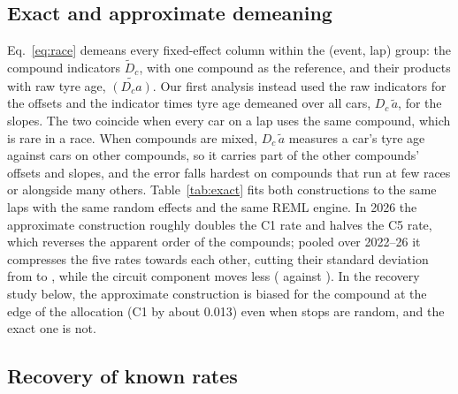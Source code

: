 \subsection{Exact and approximate demeaning}\label{app:exact}

Eq.~\eqref{eq:race} demeans every fixed-effect column within the (event, lap) group: the compound indicators $\tilde D_{c}$, with one compound as the reference, and their products with raw tyre age, $\widetilde{(D_c a)}$.
Our first analysis instead used the raw indicators for the offsets and the indicator times tyre age demeaned over all cars, $D_c\,\tilde a$, for the slopes.
The two coincide when every car on a lap uses the same compound, which is rare in a race.
When compounds are mixed, $D_c\,\tilde a$ measures a car's tyre age against cars on other compounds, so it carries part of the other compounds' offsets and slopes, and the error falls hardest on compounds that run at few races or alongside many others.
Table~\ref{tab:exact} fits both constructions to the same laps with the same random effects and the same REML engine.
In 2026 the approximate construction roughly doubles the C1 rate and halves the C5 rate, which reverses the apparent order of the compounds; pooled over 2022--26 it compresses the five rates towards each other, cutting their standard deviation from \PooledCompoundSD{} to \ApproxPoolCompoundSD\spl, while the circuit component moves less (\PersistSD{} against \ApproxPoolCircuitSD\spl).
In the recovery study below, the approximate construction is biased for the compound at the edge of the allocation (C1 by about 0.013\spl) even when stops are random, and the exact one is not.

\begin{table}[t]
\centering\footnotesize\setlength{\tabcolsep}{4pt}

\caption{Race degradation rate per compound (s/lap) under the exact demeaning of Eq.~\eqref{eq:race} and the approximate construction $D_c\,\tilde a$, on the same laps with the same random effects. Compound SD is the standard deviation of the five rates; circuit SD is the circuit-slope standard deviation (2026) or its persistent component (pooled).}
\label{tab:exact}
\end{table}

\subsection{Recovery of known rates}\label{app:recovery}

